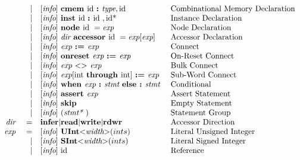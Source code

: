 \documentclass[12pt]{article}
\begin{document}
{\[\begin{array}{rrll}
                &\vert &[\text{\em info}]\  \text{\bf cmem\ } \text{id } \text{\bf :\ } \text{\em type} , \text{id}                                  &\text{Combinational Memory Declaration}\\
                &\vert &[\text{\em info}]\  \text{\bf inst\ } \text{id } \text{\bf :\ } \text{id } , \text{id}\text{*}                                 &\text{Instance Declaration}\\
                &\vert &[\text{\em info}]\  \text{\bf node\ } \text{id }  = \text{\em exp\ }                                               &\text{Node Declaration}\\
                &\vert &[\text{\em info}]\  \text{\em dir\ } \text{\bf accessor\ } \text{id } = \text{\em exp}[\text{\em exp}]                       &\text{Accessor Declaration}\\
                &\vert &[\text{\em info}]\  \text{\em exp\ } \text{\bf :=\ } \text{\em exp\ }                                               &\text{Connect}\\
                &\vert &[\text{\em info}]\  \text{\bf onreset\ } \text{\em exp\ } \text{\bf :=\ } \text{\em exp\ }                                  &\text{On-Reset Connect}\\
                &\vert &[\text{\em info}]\  \text{\em exp\ } \text{\bf $<>$\ } \text{\em exp\ }                                             &\text{Bulk Connect}\\
                &\vert &[\text{\em info}]\  \text{\em exp}[\text{int }  \text{\bf through\ } \text{int}] \ \text{\bf :=\ } \text{\em exp}               &\text{Sub-Word Connect}\\
                &\vert &[\text{\em info}]\  \text{\bf when\ } \text{\em exp\ } \text{\bf :\ } \text{\em stmt\ } \text{\bf else :\ } \text{\em stmt\ }               &\text{Conditional}\\
                &\vert &[\text{\em info}]\  \text{\bf assert\ } \text{\em exp\ }                                                    &\text{Assert Statement}\\
                &\vert &[\text{\em info}]\  \text{\bf skip\ }                                                               &\text{Empty Statement}\\
                &\vert &[\text{\em info}]\  (\text{\em stmt*\ })                                                            &\text{Statement Group}\\
\text{\em dir\ }        &=     &\text{\bf infer} \vert \text{\bf read} \vert \text{\bf write} \vert \text{\bf rdwr\ }                &\text{Accessor Direction}\\
\text{\em exp\ }        &=     &[\text{\em info}]\  \text{\bf UInt} \text{\bf $<$} \text{\em width} \text{\bf $>$}(ints)                        &\text{Literal Unsigned Integer}\\
                &\vert &[\text{\em info}]\  \text{\bf SInt} \text{\bf $<$} \text{\em width} \text{\bf $>$}(ints)                        &\text{Literal Signed Integer}\\
                &\vert &[\text{\em info}]\  \text{id }                                                                     &\text{Reference}\\

\end{array}\]}
\end{document}
